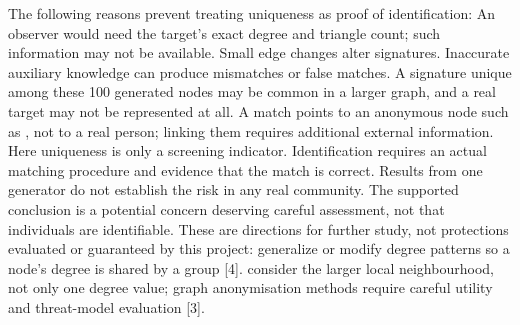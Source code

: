 {}The following reasons prevent treating uniqueness as proof of identification:\markdownRendererInterblockSeparator
{}\markdownRendererOlBeginTight
{} An observer would need the target's exact degree and triangle count; such information may not be available.\markdownRendererOlItemEnd 
{} Small edge changes alter signatures. Inaccurate auxiliary knowledge can produce mismatches or false matches.\markdownRendererOlItemEnd 
{} A signature unique among these 100 generated nodes may be common in a larger graph, and a real target may not be represented at all.\markdownRendererOlItemEnd 
{} A match points to an anonymous node such as , not to a real person; linking them requires additional external information.\markdownRendererOlItemEnd 
{} Here uniqueness is only a screening indicator. Identification requires an actual matching procedure and evidence that the match is correct.\markdownRendererOlItemEnd 
{} Results from one generator do not establish the risk in any real community.\markdownRendererOlItemEnd 
{} The supported conclusion is a potential concern deserving careful assessment, not that individuals are identifiable.\markdownRendererOlItemEnd 
\markdownRendererOlEndTight \markdownRendererInterblockSeparator
{}\markdownRendererSectionBegin
{}\markdownRendererInterblockSeparator
{}These are directions for further study, not protections evaluated or guaranteed by this project:\markdownRendererInterblockSeparator
{}\markdownRendererUlBeginTight
\markdownRendererUlItem {} generalize or modify degree patterns so a node's degree is shared by a group [4].\markdownRendererUlItemEnd 
\markdownRendererUlItem {} consider the larger local neighbourhood, not only one degree value; graph anonymisation methods require careful utility and threat-model evaluation [3].\markdownRendererUlItemEnd 

